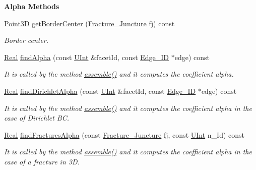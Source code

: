 \begin{Indent}{\bf Alpha Methods}\par
\begin{DoxyCompactItemize}
\item 
\hyperlink{classFVCode3D_1_1Point3D}{Point3D} \hyperlink{classFVCode3D_1_1FluxOperator_a9283ea5110f59751e1a8ea2c0b5da134}{get\+Border\+Center} (\hyperlink{classFVCode3D_1_1FluxOperator_ab9fef691b58bb04de5814d21fb59ef44}{Fracture\+\_\+\+Juncture} fj) const 
\begin{DoxyCompactList}\small\item\em Border center. \end{DoxyCompactList}\item 
\hyperlink{namespaceFVCode3D_a40c1f5588a248569d80aa5f867080e83}{Real} \hyperlink{classFVCode3D_1_1FluxOperator_adea5929ec3492d9274095f1af5c33d05}{find\+Alpha} (const \hyperlink{namespaceFVCode3D_a4bf7e328c75d0fd504050d040ebe9eda}{U\+Int} \&facet\+Id, const \hyperlink{classFVCode3D_1_1FluxOperator_a2c9bcb854de0d6aa308ff7c944a1aa31}{Edge\+\_\+\+ID} $\ast$edge) const 
\begin{DoxyCompactList}\small\item\em It is called by the method \hyperlink{classFVCode3D_1_1FluxOperator_a4f96ac53cafc68eccb01d8ff29eecc87}{assemble()} and it computes the coefficient alpha. \end{DoxyCompactList}\item 
\hyperlink{namespaceFVCode3D_a40c1f5588a248569d80aa5f867080e83}{Real} \hyperlink{classFVCode3D_1_1FluxOperator_a0fe812b8a650b83ef5815f4dee25e0cf}{find\+Dirichlet\+Alpha} (const \hyperlink{namespaceFVCode3D_a4bf7e328c75d0fd504050d040ebe9eda}{U\+Int} \&facet\+Id, const \hyperlink{classFVCode3D_1_1FluxOperator_a2c9bcb854de0d6aa308ff7c944a1aa31}{Edge\+\_\+\+ID} $\ast$edge) const 
\begin{DoxyCompactList}\small\item\em It is called by the method \hyperlink{classFVCode3D_1_1FluxOperator_a4f96ac53cafc68eccb01d8ff29eecc87}{assemble()} and it computes the coefficient alpha in the case of Dirichlet BC. \end{DoxyCompactList}\item 
\hyperlink{namespaceFVCode3D_a40c1f5588a248569d80aa5f867080e83}{Real} \hyperlink{classFVCode3D_1_1FluxOperator_a0cdfdaea15026cbb79d82ffe9dfb95e2}{find\+Fractures\+Alpha} (const \hyperlink{classFVCode3D_1_1FluxOperator_ab9fef691b58bb04de5814d21fb59ef44}{Fracture\+\_\+\+Juncture} fj, const \hyperlink{namespaceFVCode3D_a4bf7e328c75d0fd504050d040ebe9eda}{U\+Int} n\+\_\+\+Id) const 
\begin{DoxyCompactList}\small\item\em It is called by the method \hyperlink{classFVCode3D_1_1FluxOperator_a4f96ac53cafc68eccb01d8ff29eecc87}{assemble()} and it computes the coefficient alpha in the case of a fracture in 3D. \end{DoxyCompactList}\end{DoxyCompactItemize}
\end{Indent}
